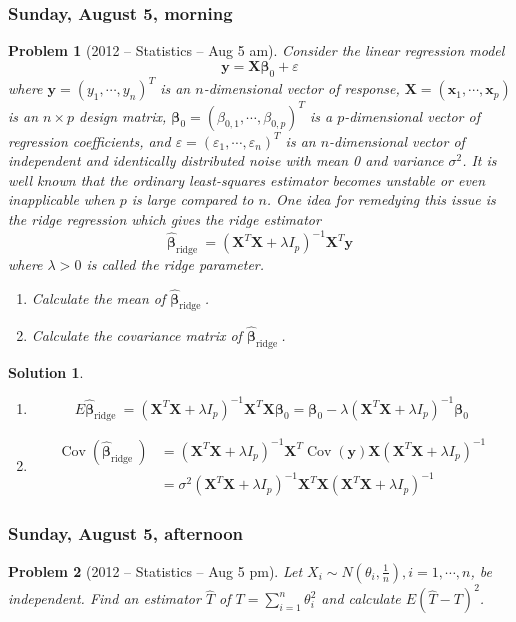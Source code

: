 \documentclass[12pt]{amsart}
\newtheorem{problem}{Problem}
\newtheorem*{solution}{Solution}
\begin{document}
\subsubsection*{Sunday, August 5, morning}
\begin{problem}[2012 -- Statistics -- Aug 5 am]
Consider the linear regression model
$$
\mathbf{y}=\mathbf{X} \boldsymbol{\beta}_0+\varepsilon
$$
where $\mathbf{y}=(y_1, \cdots, y_n)^T$ is an $n$-dimensional vector of response, $\mathbf{X}=(\mathbf{x}_1, \cdots, \mathbf{x}_p)$ is an $n \times p$ design matrix, $\boldsymbol{\beta}_0=(\beta_{0,1}, \cdots, \beta_{0, p})^T$ is a $p$-dimensional vector of regression coefficients, and $\varepsilon=(\varepsilon_1, \cdots, \varepsilon_n)^T$ is an $n$-dimensional vector of independent and identically distributed noise with mean 0 and variance $\sigma^2$. It is well known that the ordinary least-squares estimator becomes unstable or even inapplicable when $p$ is large compared to $n$. One idea for remedying this issue is the ridge regression which gives the ridge estimator
$$
\widehat{\boldsymbol{\beta}}_{\text {ridge }}=(\mathbf{X}^T \mathbf{X}+\lambda I_p)^{-1} \mathbf{X}^T \mathbf{y}
$$
where $\lambda>0$ is called the ridge parameter.
\begin{enumerate}[label=\alph*)]
\item Calculate the mean of $\widehat{\boldsymbol{\beta}}_{\text {ridge }}$.
\item Calculate the covariance matrix of $\widehat{\boldsymbol{\beta}}_{\text {ridge }}$.
\end{enumerate}
\end{problem}
\begin{solution}
\begin{enumerate}[label=\alph*)]
\item
$$
E \widehat{\boldsymbol{\beta}}_{\text {ridge }}=(\mathbf{X}^T \mathbf{X}+\lambda I_p)^{-1} \mathbf{X}^T \mathbf{X} \boldsymbol{\beta}_0=\boldsymbol{\beta}_0-\lambda(\mathbf{X}^T \mathbf{X}+\lambda I_p)^{-1} \boldsymbol{\beta}_0
$$
\item
\begin{align*}
\operatorname{Cov}(\widehat{\boldsymbol{\beta}}_{\text {ridge }}) & =(\mathbf{X}^T \mathbf{X}+\lambda I_p)^{-1} \mathbf{X}^T \operatorname{Cov}(\mathbf{y}) \mathbf{X}(\mathbf{X}^T \mathbf{X}+\lambda I_p)^{-1} \\
& =\sigma^2(\mathbf{X}^T \mathbf{X}+\lambda I_p)^{-1} \mathbf{X}^T \mathbf{X}(\mathbf{X}^T \mathbf{X}+\lambda I_p)^{-1}
\end{align*}
\end{enumerate} 
\end{solution}

\subsubsection*{Sunday, August 5, afternoon}
\begin{problem}[2012 -- Statistics -- Aug 5 pm]
Let $X_i \sim N(\theta_i, \frac{1}{n}), i=1, \cdots, n$, be independent. Find an estimator $\widehat{T}$ of $T=\sum_{i=1}^n \theta_i^2$ and calculate $E(\widehat{T}-T)^2$.
\end{problem}
\end{document}
